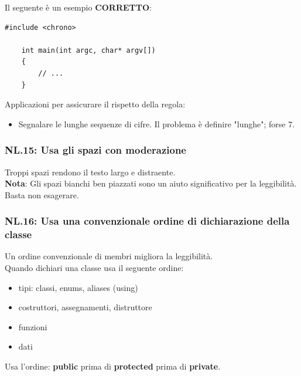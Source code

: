 \textsf{\small Il seguente è un esempio \textbf{\color{ForestGreen}CORRETTO}\normalcolor:}

\begin{lstlisting}[frame=single, rulecolor=\color{ForestGreen}]
	#include <chrono>
	
	int main(int argc, char* argv[])
	{
		// ...
	}
\end{lstlisting}

\textsf{\small Applicazioni per assicurare il rispetto della regola: }

\begin{itemize}
	\item \textsf{\small Segnalare le lunghe sequenze di cifre. Il problema è definire "lunghe"; forse 7.}
\end{itemize}

\subsubsection{NL.15: Usa gli spazi con moderazione}

\textsf{\small Troppi spazi rendono il testo largo e distraente.} \\

\textsf{\small \textbf{Nota}: Gli spazi bianchi ben piazzati sono un aiuto significativo per la leggibilità. Basta non esagerare.} \\

\subsubsection{NL.16: Usa una convenzionale ordine di dichiarazione della classe}

\textsf{\small Un ordine convenzionale di membri migliora la leggibilità.} \\

\textsf{\small Quando dichiari una classe usa il seguente ordine: } \\

\begin{itemize}
	\item \textsf{\small tipi: classi, enums, aliases (using)}
	\item \textsf{\small costruttori, assegnamenti, distruttore}
	\item \textsf{\small funzioni}
	\item \textsf{\small dati}
\end{itemize}

\textsf{\small Usa l'ordine: \textbf{public} prima di \textbf{protected} prima di \textbf{private}. } \\

